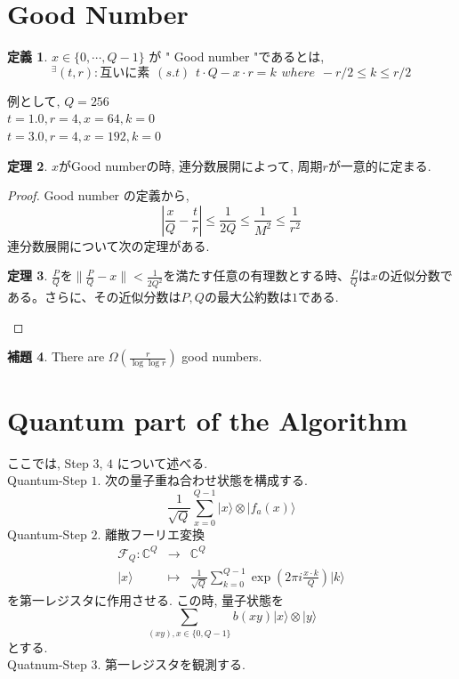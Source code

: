 \documentclass{jsarticle}
\theoremstyle{definition}
\newtheorem{theorem}{定理}
\newtheorem{definition}[theorem]{定義}
\newtheorem{lemma}[theorem]{補題}
\begin{document}
\section{Good Number}
\begin{definition}
$x \in \{0, \cdots , Q-1 \}$ が " Good number "であるとは, 
\begin{equation}\label{good}
^\exists (t, r) :互いに素 \hspace{5pt} (s.t) \hspace{5pt}   t \cdot Q -x\cdot r=k   \hspace{5pt}  where \hspace{5pt}  -r/2 \leq  k \leq r/2  
\end{equation}
\end{definition}
例として, $Q=256$\\
$t=1.0, r=4, x=64,   k=0$\\
$t=3.0, r=4, x=192, k=0$\\

\begin{theorem}
$x$がGood numberの時, 連分数展開によって, 周期$r$が一意的に定まる.
\end{theorem}
\begin{proof}
Good number の定義から, 
\begin{equation}
\left| \frac{x}{Q} -\frac{t}{r} \right| \leq \frac{1}{2Q}  \leq \frac{1}{M^2} \leq \frac{1}{r^2}
\end{equation}
連分数展開について次の定理がある.
\begin{theorem}
$\frac{P}{ Q}$を$\|\frac{P}{ Q} -x \| < \frac{1}{2Q^2}$を満たす任意の有理数とする時、$\frac{P}{ Q}$は$x$の近似分数である。さらに、その近似分数は$P,Q$の最大公約数は$1$である.
\end{theorem}
\end{proof}
\begin{lemma}
There are $\Omega\left(\frac{r}{\log\log r} \right)$ good numbers.
\end{lemma}
\section{Quantum part of the Algorithm}
ここでは, Step $3$, $4$ について述べる.\\
Quantum-Step $1$.  次の量子重ね合わせ状態を構成する.\\
\begin{equation}
\frac{1}{\sqrt{Q}} \displaystyle\sum_{x=0}^{Q-1}|x\rangle \otimes |f_a (x)\rangle
\end{equation}
Quantum-Step $2$. 離散フーリエ変換 
$$\begin{array}{rcc}
\mathcal{F}_Q: \mathbb{C}^Q &\rightarrow &\mathbb{C}^Q \\
|x \rangle                               &\mapsto     &\frac{1}{\sqrt{Q}} \displaystyle\sum_{k=0}^{Q-1}\exp\left(2\pi i \frac{x\cdot k}{Q}\right) |k\rangle 
\end{array}
$$
を第一レジスタに作用させる. この時, 量子状態を 
\begin{equation}
\displaystyle\sum_{(xy) , x \in \{ 0,Q-1 \} }b(xy)| x \rangle \otimes |y\rangle
\end{equation}とする.\\
Quatnum-Step $3$. 第一レジスタを観測する.
\end{document}
